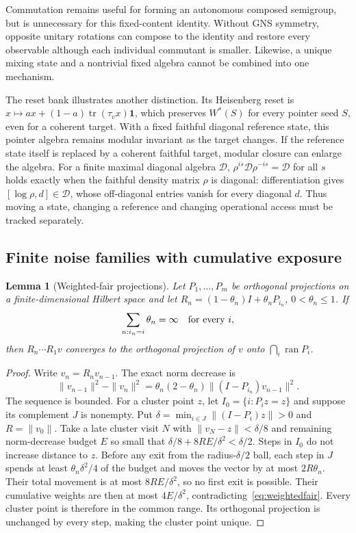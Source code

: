 \documentclass[12pt]{article}
\newtheorem{lemma}[theorem]{Lemma}
\theoremstyle{definition}
\theoremstyle{remark}
\begin{document}
Commutation remains useful for forming an autonomous composed
semigroup, but is unnecessary for this fixed-content identity.
Without GNS symmetry, opposite unitary rotations can compose to the
identity and restore every observable although each individual
commutant is smaller. Likewise, a unique mixing state and a
nontrivial fixed algebra cannot be combined into one mechanism.

The reset bank illustrates another distinction. Its Heisenberg reset
is \(x\mapsto a x+(1-a)\operatorname{tr}(\tau_vx)\mathbf1\),
which preserves \(W^*(S)\) for every pointer seed \(S\), even for a
coherent target. With a fixed faithful diagonal reference state, this
pointer algebra remains modular invariant as the target changes.
If the reference state itself is replaced by a coherent faithful
target, modular closure can enlarge the algebra. For a finite
maximal diagonal algebra \(\mathcal D\),
\(\rho^{is}\mathcal D\rho^{-is}=\mathcal D\) for all \(s\) holds
exactly when the faithful density matrix \(\rho\) is diagonal:
differentiation gives
\([\log\rho,d]\in\mathcal D\), whose off-diagonal entries vanish
for every diagonal \(d\). Thus moving a state, changing a reference
and changing operational access must be tracked separately.

\subsection{Finite noise families with cumulative exposure}

\begin{lemma}[Weighted-fair projections]\label{lem:weightedfair}
Let \(P_1,\ldots,P_m\) be orthogonal projections on a
finite-dimensional Hilbert space and let
\(R_n=(1-\theta_n)I+\theta_n P_{i_n}\), \(0<\theta_n\le1\).
If
\begin{equation}\label{eq:weightedfair}
 \sum_{n:i_n=i}\theta_n=\infty\quad\hbox{for every }i ,
\end{equation}
then \(R_n\cdots R_1v\) converges to the orthogonal projection of
\(v\) onto \(\bigcap_i\operatorname{ran}P_i\).
\end{lemma}
\begin{proof}
Write \(v_n=R_nv_{n-1}\). The exact norm decrease is
\[
 \|v_{n-1}\|^2-\|v_n\|^2
 =\theta_n(2-\theta_n)\|(I-P_{i_n})v_{n-1}\|^2 .
\]
The sequence is bounded. For a cluster point \(z\), let
\(I_0=\{i:P_i z=z\}\) and suppose its complement \(J\) is nonempty.
Put \(\delta=\min_{i\in J}\|(I-P_i)z\|>0\) and \(R=\|v_0\|\).
Take a late cluster visit \(N\) with
\(\|v_N-z\|<\delta/8\) and remaining norm-decrease budget \(E\)
so small that \(\delta/8+8RE/\delta^2<\delta/2\).
Steps in \(I_0\) do not increase distance to \(z\).
Before any exit from the radius-\(\delta/2\) ball, each step in
\(J\) spends at least \(\theta_n\delta^2/4\) of the budget and
moves the vector by at most \(2R\theta_n\). Their total movement
is at most \(8RE/\delta^2\), so no first exit is possible.
Their cumulative weights are then at most \(4E/\delta^2\),
contradicting~\eqref{eq:weightedfair}. Every cluster point is
therefore in the common range. Its orthogonal projection is
unchanged by every step, making the cluster point unique.
\end{proof}
\end{document}
